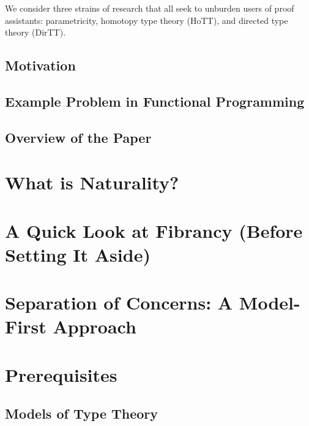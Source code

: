 \documentclass{lmcs} %
\theoremstyle{plain}\newtheorem{satz}[thm]{Satz} %
\theoremstyle{plain}
\theoremstyle{definition}
\begin{document}

We consider three strains of research that all seek to unburden users of proof assistants: parametricity, homotopy type theory (HoTT), and directed type theory (DirTT).




\subsection{Motivation}

\subsection{Example Problem in Functional Programming}

\subsection{Overview of the Paper}

\section{What is Naturality?}

\section{A Quick Look at Fibrancy (Before Setting It Aside)}

\section{Separation of Concerns: A Model-First Approach}

\section{Prerequisites}
\subsection{Models of Type Theory}
\end{document}
